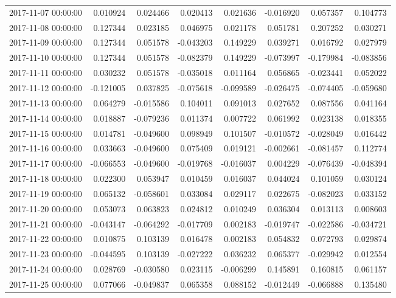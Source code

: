 \begin{tabular}{lrrrrrrr}
2017-11-07 00:00:00 & 0.010924 & 0.024466 & 0.020413 & 0.021636 & -0.016920 & 0.057357 & 0.104773 \\
2017-11-08 00:00:00 & 0.127344 & 0.023185 & 0.046975 & 0.021178 & 0.051781 & 0.207252 & 0.030271 \\
2017-11-09 00:00:00 & 0.127344 & 0.051578 & -0.043203 & 0.149229 & 0.039271 & 0.016792 & 0.027979 \\
2017-11-10 00:00:00 & 0.127344 & 0.051578 & -0.082379 & 0.149229 & -0.073997 & -0.179984 & -0.083856 \\
2017-11-11 00:00:00 & 0.030232 & 0.051578 & -0.035018 & 0.011164 & 0.056865 & -0.023441 & 0.052022 \\
2017-11-12 00:00:00 & -0.121005 & 0.037825 & -0.075618 & -0.099589 & -0.026475 & -0.074405 & -0.059680 \\
2017-11-13 00:00:00 & 0.064279 & -0.015586 & 0.104011 & 0.091013 & 0.027652 & 0.087556 & 0.041164 \\
2017-11-14 00:00:00 & 0.018887 & -0.079236 & 0.011374 & 0.007722 & 0.061992 & 0.023138 & 0.018355 \\
2017-11-15 00:00:00 & 0.014781 & -0.049600 & 0.098949 & 0.101507 & -0.010572 & -0.028049 & 0.016442 \\
2017-11-16 00:00:00 & 0.033663 & -0.049600 & 0.075409 & 0.019121 & -0.002661 & -0.081457 & 0.112774 \\
2017-11-17 00:00:00 & -0.066553 & -0.049600 & -0.019768 & -0.016037 & 0.004229 & -0.076439 & -0.048394 \\
2017-11-18 00:00:00 & 0.022300 & 0.053947 & 0.010459 & 0.016037 & 0.044024 & 0.101059 & 0.030124 \\
2017-11-19 00:00:00 & 0.065132 & -0.058601 & 0.033084 & 0.029117 & 0.022675 & -0.082023 & 0.033152 \\
2017-11-20 00:00:00 & 0.053073 & 0.063823 & 0.024812 & 0.010249 & 0.036304 & 0.013113 & 0.008603 \\
2017-11-21 00:00:00 & -0.043147 & -0.064292 & -0.017709 & 0.002183 & -0.019747 & -0.022586 & -0.034721 \\
2017-11-22 00:00:00 & 0.010875 & 0.103139 & 0.016478 & 0.002183 & 0.054832 & 0.072793 & 0.029874 \\
2017-11-23 00:00:00 & -0.044595 & 0.103139 & -0.027222 & 0.036232 & 0.065377 & -0.029942 & 0.012554 \\
2017-11-24 00:00:00 & 0.028769 & -0.030580 & 0.023115 & -0.006299 & 0.145891 & 0.160815 & 0.061157 \\
2017-11-25 00:00:00 & 0.077066 & -0.049837 & 0.065358 & 0.088152 & -0.012449 & -0.066888 & 0.135480 \\

\end{tabular}
